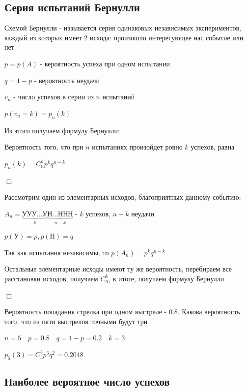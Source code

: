 \documentclass[12pt]{article}
\begin{document}

    \subsection{Серия испытаний Бернулли}

    Схемой Бернулли - называется серия одинаковых независимых экспериментов, каждый из которых имеет 2 исхода: произошло интересующее нас событие или нет

    $p = p(A)$ - вероятность успеха при одном испытании

    $q = 1 - p$ - вероятность неудачи

    $v_n$ - число успехов в серии из $n$ испытаний

    $p(v_n = k) = p_n(k)$

    Из этого получаем формулу Бернулли:

    \begin{MyTheorem}
        \Ths Вероятность того, что при $n$ испытаниях произойдет ровно $k$ успехов, равна

        $p_n(k) = C_n^k p^k q^{n - k}$
    \end{MyTheorem}

    \begin{MyProof}
        $\Box$

        Рассмотрим один из элементарных исходов, благоприятных данному событию:

        $A_n = \underset{k}{\underbrace{\text{УУУ}\dots\text{У}}}\underset{n - k}{\underbrace{\text{Н}\dots\text{ННН}}}$ - $k$ успехов, $n - k$ неудачи

        $p(\text{У}) = p, p(\text{Н}) = q$

        Так как испытания независимы, то $p(A_n) = p^k q^{n - k}$

        Остальные элементарные исходы имеют ту же вероятность, перебираем все расстановки исходов, получаем $C_n^k$, в итоге, получаем формулу Бернулли

        $\Box$
    \end{MyProof}

    \Ex Вероятность попадания стрелка при одном выстреле - $0.8$. Какова вероятность того, что из пяти выстрелов точными будут три

    $n = 5 \quad p = 0.8 \quad q = 1 - p = 0.2 \quad k = 3$

    $p_5(3) = C^3_5 p^3 q^2 = 0.2048$

    \subsection{Наиболее вероятное число успехов}
\end{document}
